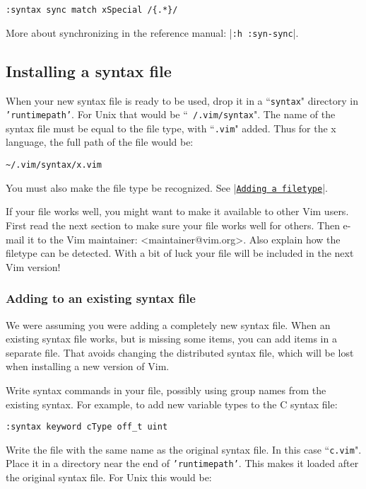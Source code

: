 \begin{Verbatim}[samepage=true]
 :syntax sync match xSpecial /{.*}/
\end{Verbatim}

More about synchronizing in the reference manual: |\texttt{:h :syn-sync}|.
\subsection{Installing a syntax file}
When your new syntax file is ready to be used, drop it in a ``\texttt{syntax}" directory in \texttt{'runtimepath'}.
For Unix that would be ``\texttt{~/.vim/syntax}".
The name of the syntax file must be equal to the file type, with ``\texttt{.vim}" added.
Thus for the x language, the full path of the file would be:

\begin{Verbatim}[samepage=true]
    ~/.vim/syntax/x.vim 
\end{Verbatim}

You must also make the file type be recognized.
See |\hyperref[Adding a filetype]{\texttt{Adding a filetype}}|.

If your file works well, you might want to make it available to other Vim users.
First read the next section to make sure your file works well for others. Then e-mail it to the Vim maintainer: <maintainer@vim.org>. Also explain how the filetype can be detected.
With a bit of luck your file will be included in the next Vim version!

\subsubsection{Adding to an existing syntax file}
We were assuming you were adding a completely new syntax file.
When an existing syntax file works, but is missing some items, you can add items in a separate file.
That avoids changing the distributed syntax file, which will be lost when installing a new version of Vim.

Write syntax commands in your file, possibly using group names from the existing syntax.
For example, to add new variable types to the C syntax file:

\begin{Verbatim}[samepage=true]
 :syntax keyword cType off_t uint
\end{Verbatim}

Write the file with the same name as the original syntax file.
In this case ``\texttt{c.vim}".
Place it in a directory near the end of \texttt{'runtimepath'}.
This makes it loaded after the original syntax file.
For Unix this would be:

